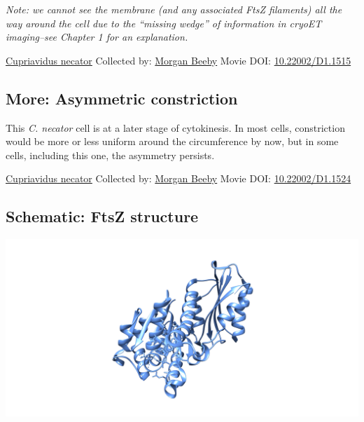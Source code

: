 \documentclass[]{tufte-book}
\begin{document}
\emph{Note: we cannot see the membrane (and any associated FtsZ filaments) all the way around the cell due to the ``missing wedge'' of information in cryoET imaging--see Chapter 1 for an explanation.}



\hypertarget{htmlwidget-041e707a3ca63e2c0eea}{}

\label{fig:5-9}\protect\hyperlink{tree}{Cupriavidus necator} Collected by: \protect\hyperlink{morgan_beeby}{Morgan Beeby} Movie DOI: \href{https://doi.org/10.22002/D1.1515}{10.22002/D1.1515}

\hypertarget{Asymmetric_constriction}{%
\subsection*{More: Asymmetric constriction}\label{Asymmetric_constriction}}

This \emph{C. necator} cell is at a later stage of cytokinesis. In most cells, constriction would be more or less uniform around the circumference by now, but in some cells, including this one, the asymmetry persists.



\hypertarget{htmlwidget-2fa2b98e7d2bb87ef686}{}

\label{fig:5-9a}\protect\hyperlink{tree}{Cupriavidus necator} Collected by: \protect\hyperlink{morgan_beeby}{Morgan Beeby} Movie DOI: \href{https://doi.org/10.22002/D1.1524}{10.22002/D1.1524}

\hypertarget{FtsZ_structure}{%
\subsection*{Schematic: FtsZ structure}\label{FtsZ_structure}}

\includegraphics{img/schematics/5_9_1}
\end{document}
